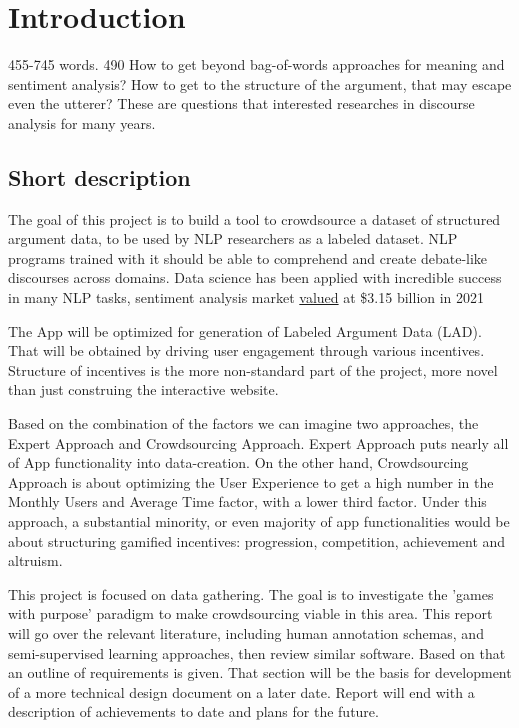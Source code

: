 \documentclass{article}
\begin{document}
\newpage

\tableofcontents

\newpage

\chapter{Introduction} 455-745 words. 490
How to get beyond bag-of-words approaches for meaning and sentiment analysis? How to get to the structure of the argument, that may escape even the utterer?
These are questions that interested researches in discourse analysis for many years.

\section{Short description}
The goal of this project is to build a tool to crowdsource a dataset of structured argument data, to be used by NLP researchers as a labeled dataset.
NLP programs trained with it should be able to comprehend and create debate-like discourses across domains.
Data science has been applied with incredible success in many NLP tasks, sentiment analysis market \href{https://www.polarismarketresearch.com/industry-analysis/sentiment-analytics-market}{valued} at \$3.15 billion in 2021 

The App will be optimized for generation of Labeled Argument Data (LAD). That will be obtained by driving user engagement through various incentives. 
Structure of incentives is the more non-standard part of the project, more novel than just construing the interactive website.

Based on the combination of the factors we can imagine two approaches, the Expert Approach and Crowdsourcing Approach.  Expert Approach puts nearly all of App functionality into data-creation. 
On the other hand, Crowdsourcing Approach is about optimizing the User Experience to get a high number in the Monthly Users and Average Time factor, with a lower third factor.  Under this approach, a substantial minority, or even majority of app functionalities would be about structuring gamified incentives: progression, competition, achievement and altruism.

This project is focused on data gathering. The goal is to investigate the 'games with purpose' paradigm to make crowdsourcing viable in this area.
This report will go over the relevant literature, including human annotation schemas, and semi-supervised learning approaches, then review similar software. Based on that an outline of requirements is given. 
That section will be the basis for development of a more technical design document on a later date.
Report will end with a description of achievements to date and plans for the future.
\end{document}
